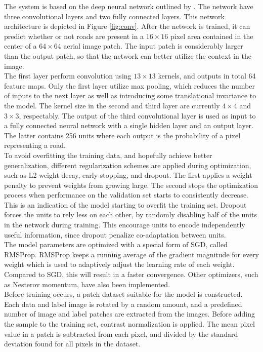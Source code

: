 The system is based on the deep neural network outlined by \cite{Mnih_aerial_images_noisy}. The network have three convolutional layers and two fully connected layers. This network architecture is depicted in Figure \ref{fig:conv}. After the network is trained, it can predict whether or not roads are present in a $16 \times 16$ pixel area contained in the center of a $64 \times 64$ aerial image patch. The input patch is considerably larger than the output patch, so that the network can better utilize the context in the image. \\

The first layer perform convolution using $13 \times 13$ kernels, and outputs in total 64 feature maps. Only the first layer utilize max pooling, which reduces the number of inputs to the next layer as well as introducing some translational invariance to the model. The kernel size in the second and third layer are currently $4 \times 4$ and $3 \times 3$, respectably. The output of the third convolutional layer is used as input to a fully connected neural network with a single hidden layer and an output layer. The latter contains 256 units where each output is the probability of a pixel representing a road.\\

To avoid overfitting the training data, and hopefully achieve better generalization, different regularization schemes are applied during optimization, such as L2 weight decay, early stopping, and dropout. The first applies a weight penalty to prevent weights from growing large. The second stops the optimization process when performance on the validation set starts to consistently decrease. This is an indication of the model starting to overfit the training set. Dropout forces the units to rely less on each other, by randomly disabling half of the units in the network during training. This encourage units to encode independently useful information, since dropout penalize co-adaptation between units.\\

The model parameters are optimized with a special form of \ac{SGD}, called RMSProp. RMSProp keeps a running average of the gradient magnitude for every weight which is used to adaptively adjust the learning rate of each weight. Compared to \ac{SGD}, this will result in a faster convergence. Other optimizers, such as Nesterov momentum, have also been implemented.\\ 

Before training occurs, a patch dataset suitable for the model is constructed. Each data and label image is rotated by a random amount, and a predefined number of image and label patches are extracted from the images. Before adding the sample to the training set, contrast normalization is applied. The mean pixel value in a patch is subtracted from each pixel, and divided by the standard deviation found for all pixels in the dataset.\\

